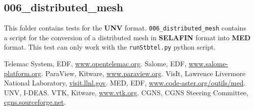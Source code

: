 \documentclass[a4paper,10pt]{article}
\newcommand{\slf}{\textbf{SELAFIN}\xspace}
\newcommand{\unv}{\textbf{UNV}\xspace}
\newcommand{\med}{\textbf{MED}\xspace}
\begin{document}
\subsection{006\_distributed\_mesh}

This folder contains tests for the \unv format.  \verb+006_distributed_mesh+
contains a script for the conversion of a distributed mesh in \slf format into
\med format. This test can only work with the \verb+runStbtel.py+ python
script.

\begin{thebibliography}{9}
  Telemac System,
  EDF,
  \url{www.opentelemac.org}.
  Salome,
  EDF,
  \url{www.salome-platform.org}.
  ParaView,
  Kitware,
  \url{www.paraview.org}.
  VisIt,
  Lawrence Livermore National Laboratory,
  \url{visit.llnl.gov}.
  MED,
  EDF,
  \url{www.code-aster.org/outils/med}.
  UNV,
  I-DEAS.
  VTK,
  Kitware,
  \url{www.vtk.org}.
  CGNS,
  CGNS Steering Committee,
  \url{cgns.sourceforge.net}.
\end{thebibliography}
\end{document}
